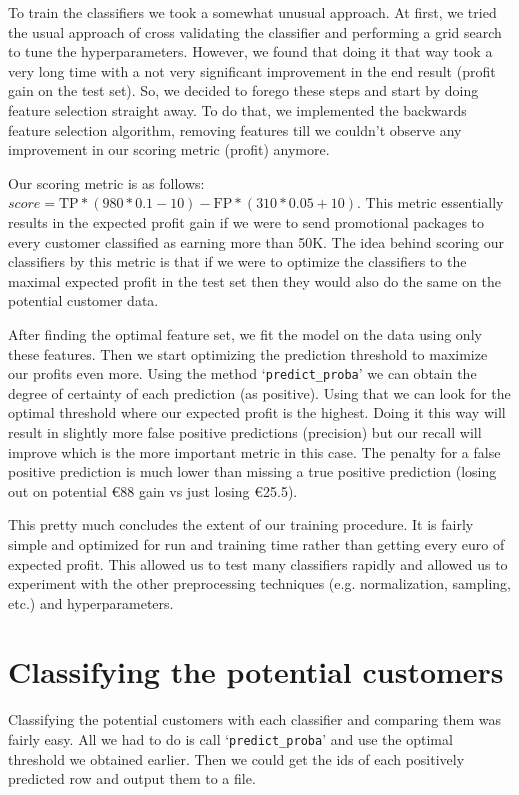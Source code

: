\documentclass{article}
\begin{document}
To train the classifiers we took a somewhat unusual approach. At first, we tried the usual approach of cross validating the classifier and performing a grid search to tune the hyperparameters. However, we found that doing it that way took a very long time with a not very significant improvement in the end result (profit gain on the test set). So, we decided to forego these steps and start by doing feature selection straight away. To do that, we implemented the backwards feature selection algorithm, removing features till we couldn't observe any improvement in our scoring metric (profit) anymore.

Our scoring metric is as follows: $score = \text{TP} * (980 * 0.1 - 10) - \text{FP} * (310 * 0.05 + 10)$.
This metric essentially results in the expected profit gain if we were to send promotional packages to every customer classified as earning more than 50K. The idea behind scoring our classifiers by this metric is that if we were to optimize the classifiers to the maximal expected profit in the test set then they would also do the same on the potential customer data.

After finding the optimal feature set, we fit the model on the data using only these features. Then we start optimizing the prediction threshold to maximize our profits even more. Using the method `\verb|predict_proba|' we can obtain the degree of certainty of each prediction (as positive). Using that we can look for the optimal threshold where our expected profit is the highest. Doing it this way will result in slightly more false positive predictions (precision) but our recall will improve which is the more important metric in this case. The penalty for a false positive prediction is much lower than missing a true positive prediction (losing out on potential €88 gain vs just losing €25.5).

This pretty much concludes the extent of our training procedure. It is fairly simple and optimized for run and training time rather than getting every euro of expected profit. This allowed us to test many classifiers rapidly and allowed us to experiment with the other preprocessing techniques (e.g. normalization, sampling, etc.) and hyperparameters.

\section{Classifying the potential customers}
Classifying the potential customers with each classifier and comparing them was fairly easy. All we had to do is call `\verb|predict_proba|' and use the optimal threshold we obtained earlier. Then we could get the ids of each positively predicted row and output them to a file.
\end{document}
